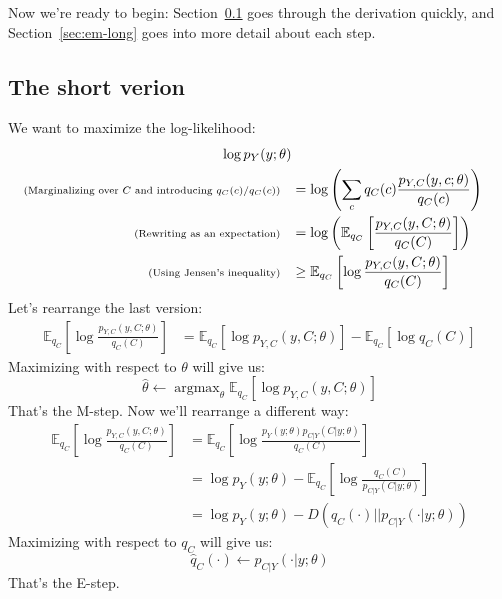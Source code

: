 \documentclass[12pt]{article}
\DeclareMathOperator*{\argmax}{\mathrm{argmax}}
\begin{document}
    Now we're ready to begin: Section~\ref{sec:em-short} goes through the
    derivation quickly, and Section~\ref{sec:em-long} goes into more detail
    about each step.
    \subsection{The short verion}
    \label{sec:em-short}
    We want to maximize the log-likelihood:
    \begin{align*}
        \log p_Y(y; \theta) \\
        \scriptsize{\text{(Marginalizing over $C$ and introducing $q_C(c)/q_C(c)$)}}\quad
            &= \log\left(\sum_c q_C(c) \frac{p_{Y,C}(y,c; \theta)}{q_C(c)}\right) \\
            \scriptsize{\text{(Rewriting as an expectation)}}\quad
            &= \log\left(\mathbb{E}_{q_C}\left[\frac{p_{Y,C}(y,C; \theta)}{q_C(C)}\right]\right)\\
            \scriptsize{\text{(Using Jensen's inequality)}}\quad
            &\geq \mathbb{E}_{q_C}\left[\log \frac{p_{Y,C}(y,C; \theta)}{q_C(C)} \right]
    \end{align*}
    Let's rearrange the last version:
    \begin{align*}
        \mathbb{E}_{q_C}\left[\log \frac{p_{Y,C}(y,C; \theta)}{q_C(C)} \right]
        &= \mathbb{E}_{q_C}\left[\log p_{Y,C}(y,C; \theta)\right] - \mathbb{E}_{q_C} [\log q_C(C)]
    \end{align*}
    Maximizing with respect to $\theta$ will give us:
    \begin{equation*}
        \boxed{\widehat{\theta} \gets \argmax_\theta \mathbb{E}_{q_C}\left[\log p_{Y,C}(y,C; \theta)\right]}
    \end{equation*}
    That's the M-step. Now we'll rearrange a different way:
    \begin{align*}
        \mathbb{E}_{q_C}\left[\log \frac{p_{Y,C}(y,C; \theta)}{q_C(C)} \right] 
        &= \mathbb{E}_{q_C}\left[\log \frac{p_{Y}(y; \theta)p_{C|Y}(C|y; \theta)}{q_C(C)} \right] \\
        &= \log p_{Y}(y; \theta) - \mathbb{E}_{q_C}\left[\log \frac{q_C(C)}{p_{C|Y}(C|y; \theta)}\right] \\
        &= \log p_{Y}(y; \theta) - D(q_C(\cdot)||p_{C|Y}(\cdot|y; \theta))
    \end{align*}
    Maximizing with respect to $q_C$ will give us:
    \begin{equation*}
        \boxed{\widehat{q}_C(\cdot) \gets p_{C|Y}(\cdot|y; \theta)}
    \end{equation*}
    That's the E-step.
\end{document}
